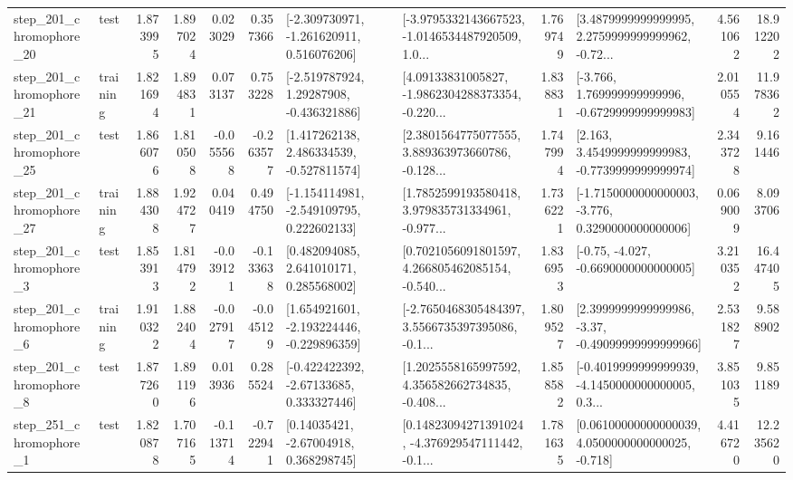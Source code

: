 \begin{tabular}{llrrrrllrlrr}
  step\_201\_chromophore\_20 &      test &      1.873995 &    1.897024 &      0.023029 &  0.357366 &   [-2.309730971, -1.261620911, 0.516076206] &  [-3.9795332143667523, -1.0146534487920509, 1.0... &       1.769749 &  [3.4879999999999995, 2.2759999999999962, -0.72... &            4.561062 &         18.912202 \\
  step\_201\_chromophore\_21 &  training &      1.821694 &    1.894831 &      0.073137 &  0.753228 &    [-2.519787924, 1.29287908, -0.436321886] &  [4.09133831005827, -1.9862304288373354, -0.220... &       1.838831 &   [-3.766, 1.769999999999996, -0.6729999999999983] &            2.010554 &         11.978362 \\
  step\_201\_chromophore\_25 &      test &      1.866076 &    1.810508 &     -0.055568 & -0.263577 &    [1.417262138, 2.486334539, -0.527811574] &  [2.3801564775077555, 3.889363973660786, -0.128... &       1.747994 &   [2.163, 3.4549999999999983, -0.7739999999999974] &            2.343728 &          9.161446 \\
  step\_201\_chromophore\_27 &  training &      1.884308 &    1.924727 &      0.040419 &  0.494750 &   [-1.154114981, -2.549109795, 0.222602133] &  [1.7852599193580418, 3.979835731334961, -0.977... &       1.736221 &  [-1.7150000000000003, -3.776, 0.3290000000000006] &            0.069009 &          8.093706 \\
   step\_201\_chromophore\_3 &      test &      1.853913 &    1.814792 &     -0.039121 & -0.133638 &     [0.482094085, 2.641010171, 0.285568002] &  [0.7021056091801597, 4.266805462085154, -0.540... &       1.836953 &               [-0.75, -4.027, -0.6690000000000005] &            3.210352 &         16.447405 \\
   step\_201\_chromophore\_6 &  training &      1.910322 &    1.882404 &     -0.027917 & -0.045129 &   [1.654921601, -2.193224446, -0.229896359] &  [-2.7650468305484397, 3.5566735397395086, -0.1... &       1.809527 &  [2.3999999999999986, -3.37, -0.49099999999999966] &            2.531827 &          9.588902 \\
   step\_201\_chromophore\_8 &      test &      1.877260 &    1.891196 &      0.013936 &  0.285524 &    [-0.422422392, -2.67133685, 0.333327446] &  [1.2025558165997592, 4.356582662734835, -0.408... &       1.858582 &  [-0.4019999999999939, -4.1450000000000005, 0.3... &            3.851035 &          9.851189 \\
   step\_251\_chromophore\_1 &      test &      1.820878 &    1.707165 &     -0.113714 & -0.722941 &      [0.14035421, -2.67004918, 0.368298745] &  [0.14823094271391024, -4.376929547111442, -0.1... &       1.781635 &  [0.06100000000000039, 4.0500000000000025, -0.718] &            4.416720 &         12.235620 \\

\end{tabular}
